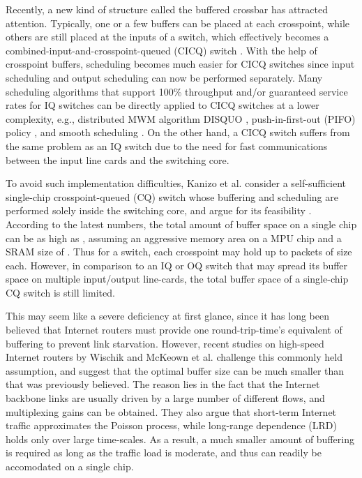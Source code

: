\documentclass[journal,final,doublecolumn,10pt,twoside]{IEEEtranTCOM} \normalsize
\begin{document}
Recently, a new kind of structure called the buffered crossbar has attracted attention. Typically, one or a few buffers can be placed at each crosspoint, while others are still placed at the inputs of a switch, which effectively becomes a combined-input-and-crosspoint-queued (CICQ) switch \cite{cicq}. With the help of crosspoint buffers, scheduling becomes much easier for CICQ switches since input scheduling and output scheduling can now be performed separately. Many scheduling algorithms that support 100\% throughput and/or guaranteed service rates for IQ switches can be directly applied to CICQ switches at a lower complexity, e.g., distributed MWM algorithm DISQUO \cite{disquo}, push-in-first-out (PIFO) policy \cite{chuang05}, and smooth scheduling \cite{smoothscheduling}. On the other hand, a CICQ switch suffers from the same problem as an IQ switch due to the need for fast communications between the input line cards and the switching core. 

To avoid such implementation difficulties, Kanizo et al. \cite{cqs} consider a self-sufficient single-chip crosspoint-queued (CQ) switch whose buffering and scheduling are performed solely inside the switching core, and argue for its feasibility \cite{asic01,asic02,asic03}. According to the latest numbers, the total amount of buffer space on a single chip can be as high as , assuming an aggressive  memory area on a  MPU chip and a SRAM size of . Thus for a  switch, each crosspoint may hold up to  packets of size  each. However, in comparison to an IQ or OQ switch that may spread its buffer space on multiple input/output line-cards, the total buffer space of a single-chip CQ switch is still limited.

This may seem like a severe deficiency at first glance, since it has long been believed that Internet routers must provide one round-trip-time's equivalent of buffering to prevent link starvation. However, recent studies on high-speed Internet routers by Wischik and McKeown et al. \cite{sizing02,sizing04} challenge this commonly held assumption, and suggest that the optimal buffer size can be much smaller than that was previously believed. The reason lies in the fact that the Internet backbone links are usually driven by a large number of different flows, and multiplexing gains can be obtained. They also argue that short-term Internet traffic approximates the Poisson process, while long-range dependence (LRD) holds only over large time-scales. As a result, a much smaller amount of buffering is required as long as the traffic load is moderate, and thus can readily be accomodated on a single chip.
\end{document}
